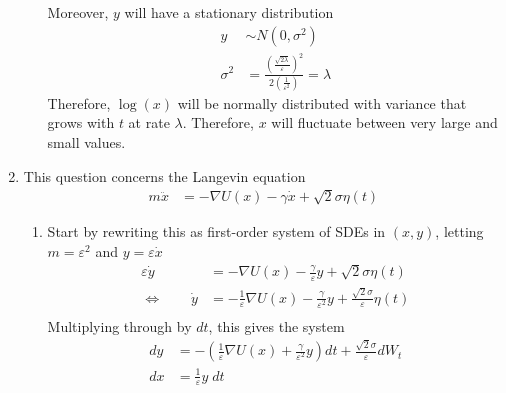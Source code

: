 \documentclass[12pt]{article}
\theoremstyle{plain}
\theoremstyle{definition}
\theoremstyle{remark}
\begin{document}
\begin{enumerate}
\begin{enumerate}
      Moreover, $y$ will have a stationary distribution
      \begin{align*}
        y &\sim N(0,\sigma^2) \\
        \sigma^2 &= \frac{\left(\frac{\sqrt{2\lambda}}{\varepsilon}\right)^2}{2\left(%
        \frac{1}{\varepsilon^2}\right)} = \lambda
      \end{align*}
      Therefore, $\log(x)$ will be normally distributed with variance
      that grows with $t$ at rate $\lambda$. Therefore, $x$ will
      fluctuate between very large and small values.
  \end{enumerate}

  \clearpage
  \item %
    This question concerns the Langevin equation
    \begin{align*}
      m \ddot{x} &= -\nabla U(x) - \gamma \dot{x} + \sqrt{2}\sigma \eta(t)
    \end{align*}
    \begin{enumerate}
      \item %
        Start by rewriting this as first-order system of SDEs in
        $(x,y)$, letting $m=\varepsilon^2$ and
        $y=\varepsilon\dot{x}$
        \begin{align*}
          \varepsilon \dot{y} &= -\nabla U(x) - \frac{\gamma}{\varepsilon} y + \sqrt{2}\sigma \eta(t)\\
          \Leftrightarrow \qquad
          \dot{y} &= -\frac{1}{\varepsilon}\nabla U(x) - \frac{\gamma}{\varepsilon^2} y
          + \frac{\sqrt{2}\sigma}{\varepsilon} \eta(t)\\
        \end{align*}
        Multiplying through by $dt$, this gives the system
        \begin{align*}
          dy &= -\left(\frac{1}{\varepsilon}\nabla U(x) + \frac{\gamma}{\varepsilon^2} y\right) dt
          + \frac{\sqrt{2}\sigma}{\varepsilon} dW_t\\
          dx &= \frac{1}{\varepsilon} y \; dt
        \end{align*}


\end{enumerate}
\end{enumerate}
\end{document}
